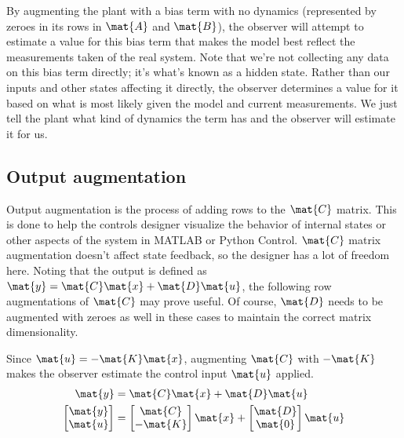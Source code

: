 By augmenting the \gls{plant} with a bias term with no dynamics (represented by
zeroes in its rows in $\mat{A}$ and $\mat{B}$), the \gls{observer} will attempt
to estimate a value for this bias term that makes the \gls{model} best reflect
the measurements taken of the real \gls{system}. Note that we're not collecting
any data on this bias term directly; it's what's known as a hidden \gls{state}.
Rather than our \glspl{input} and other \glspl{state} affecting it directly, the
\gls{observer} determines a value for it based on what is most likely given the
\gls{model} and current measurements. We just tell the \gls{plant} what kind of
dynamics the term has and the \gls{observer} will estimate it for us.

\subsection{Output augmentation}

Output augmentation is the process of adding rows to the $\mat{C}$ matrix. This
is done to help the controls designer visualize the behavior of internal states
or other aspects of the \gls{system} in MATLAB or Python Control. $\mat{C}$
matrix augmentation doesn't affect \gls{state} feedback, so the designer has a
lot of freedom here. Noting that the \gls{output} is defined as
$\mat{y} = \mat{C}\mat{x} + \mat{D}\mat{u}$, the following row augmentations of
$\mat{C}$ may prove useful. Of course, $\mat{D}$ needs to be augmented with
zeroes as well in these cases to maintain the correct matrix dimensionality.

Since $\mat{u} = -\mat{K}\mat{x}$, augmenting $\mat{C}$ with $-\mat{K}$ makes
the \gls{observer} estimate the \gls{control input} $\mat{u}$ applied.
\begin{align*}
  \mat{y} &= \mat{C}\mat{x} + \mat{D}\mat{u} \\
  \begin{bmatrix}
    \mat{y} \\
    \mat{u}
  \end{bmatrix} &=
  \begin{bmatrix}
    \mat{C} \\
    -\mat{K}
  \end{bmatrix}
  \mat{x} +
  \begin{bmatrix}
    \mat{D} \\
    \mat{0}
  \end{bmatrix}
  \mat{u}
\end{align*}

